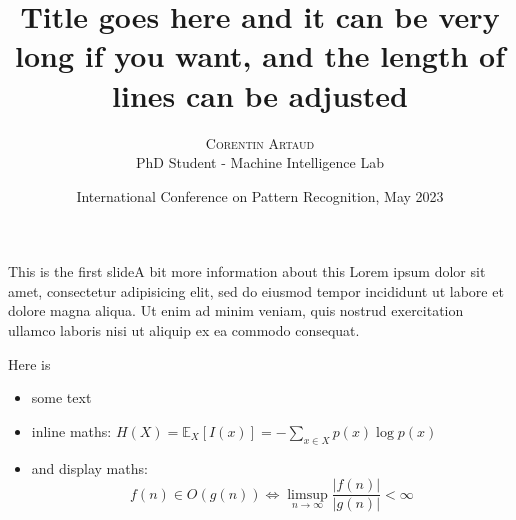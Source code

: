 \documentclass[pdf]{beamer}
\title[Short title here]{Title goes here and it can be very long if you want, and the length of lines can be adjusted}
\author{%
    {\textsc{Corentin Artaud}} \\[0.5ex]
    PhD Student - Machine Intelligence Lab
}
\institute{%
    \textit{Institute of Digital Technologies,}\\
    \textit{Loughborough University London}
}
\date[ICPR23]{International Conference on Pattern Recognition, May 2023}
\begin{document}
    {
    \begin{frame}[plain]
        \titlepage
    \end{frame}
    }
    
    \begin{frame}{This is the first slide}{A bit more information about this}
        Lorem ipsum dolor sit amet, consectetur adipisicing elit, sed do eiusmod
        tempor incididunt ut labore et dolore magna aliqua. Ut enim ad minim veniam,
        quis nostrud exercitation ullamco laboris nisi ut aliquip ex ea commodo
        consequat.

        Here is
        \begin{itemize}
            \item some text
            \item inline maths: \(H(X) = \mathbb{E}_X[I(x)] = -\sum_{x \in X} p(x) \log p(x)\)
            \item and display maths:
            \[
                f(n) \in O(g(n)) \Leftrightarrow \limsup_{n \rightarrow \infty} \frac{|f(n)|}{|g(n)|} < \infty
            \]
        \end{itemize}
    \end{frame}
\end{document}
